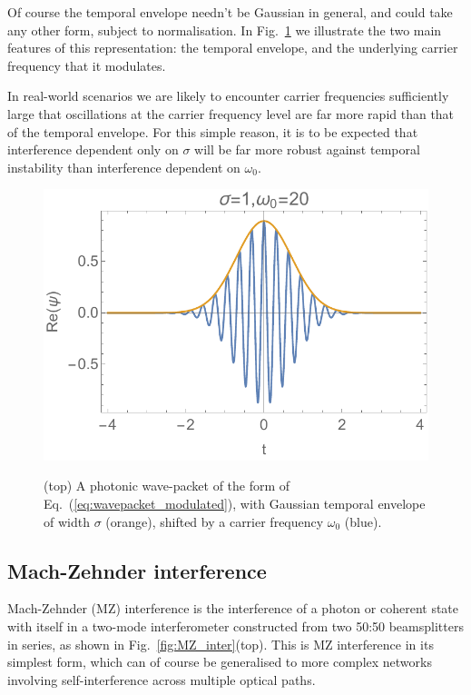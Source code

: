 \documentclass[aps, rmp, twocolumn, amsmath, amssymb, nofootinbib, superscriptaddress, longbibliography, floatfix, table-of-contents, eqsecnum]{revtex4-1}
\begin{document}
Of course the temporal envelope needn't be Gaussian in general, and could take any other form, subject to normalisation. In Fig.~\ref{fig:HOM_vs_MZ} we illustrate the two main features of this representation: the temporal envelope, and the underlying carrier frequency that it modulates.

In real-world scenarios we are likely to encounter carrier frequencies sufficiently large that oscillations at the carrier frequency level are far more rapid than that of the temporal envelope. For this simple reason, it is to be expected that interference dependent only on $\sigma$ will be far more robust against temporal instability than interference dependent on $\omega_0$.

\begin{figure}[!htb]
	\includegraphics[width=\columnwidth]{wavepacket} \\
	\caption{(top) A photonic wave-packet of the form of Eq.~(\ref{eq:wavepacket_modulated}), with Gaussian temporal envelope of width $\sigma$ (orange), shifted by a carrier frequency $\omega_0$ (blue).} \label{fig:HOM_vs_MZ}
\end{figure}

%
%

\subsection{Mach-Zehnder interference}  \label{sec:MZ_inter}

Mach-Zehnder (MZ) interference is the interference of a photon or coherent state with itself in a two-mode interferometer constructed from two 50:50 beamsplitters in series, as shown in Fig.~\ref{fig:MZ_inter}(top). This is MZ interference in its simplest form, which can of course be generalised to more complex networks involving self-interference across multiple optical paths.
\end{document}

